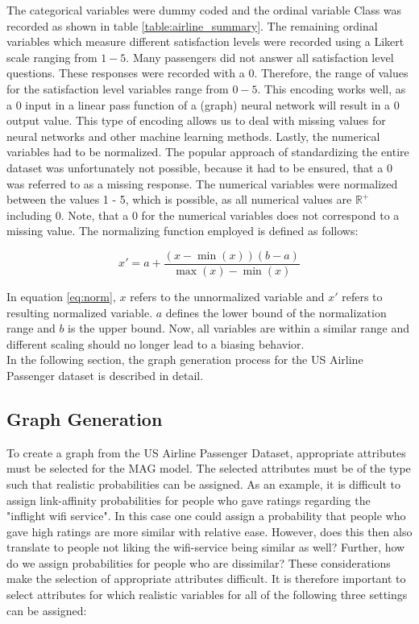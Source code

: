   \noindent The categorical variables were dummy coded and the ordinal variable
  Class was recorded as shown in table \ref{table:airline_summary}. The
  remaining ordinal variables which measure different satisfaction levels were
  recorded using a Likert scale ranging from $1 - 5$. Many passengers did not
  answer all satisfaction level questions. These responses were recorded
  with a 0. Therefore, the range of values for the satisfaction level variables
  range from $0 - 5$. This encoding works well, as a 0 input in a linear pass
  function of a (graph) neural network will result in a 0 output value. This
  type of encoding allows us to deal with missing values for neural networks
  and other machine learning methods. Lastly, the numerical variables had to be
  normalized. The popular approach of standardizing the entire dataset was 
  unfortunately not possible, because it had to be ensured, that a 0 was 
  referred to as a missing response. The numerical variables were normalized 
  between the values 1 - 5, which is possible, as all numerical values are 
  $\mathbb{R}^{+}$ including 0. Note, that a 0 for the numerical variables does
  not correspond to a missing value. The normalizing function employed is
  defined as follows:

  \begin{equation}
    x' = a + \frac{(x - \min(x))(b - a)}{\max(x) - \min(x)}
    \label{eq:norm}
  \end{equation}

  \noindent In equation \ref{eq:norm}, $x$ refers to the unnormalized 
  variable and $x'$ refers to resulting normalized variable. $a$ defines 
  the lower bound of the normalization range and $b$ is the upper bound. Now,
  all variables are within a similar range and different scaling should no
  longer lead to a biasing behavior. \\

  \noindent In the following section, the graph generation process for the US
  Airline Passenger dataset is described in detail.

  \subsection{Graph Generation}

  To create a graph from the US Airline Passenger Dataset, appropriate
  attributes must be selected for the MAG model. The selected attributes must be
  of the type such that realistic probabilities can be assigned. As an example, 
  it is difficult to assign link-affinity probabilities for people who gave 
  ratings regarding the "inflight wifi service". In this case one could assign 
  a probability that people who gave high ratings are more similar with 
  relative ease. However, does this then also translate to people not liking 
  the wifi-service being similar as well? Further, how do we assign 
  probabilities for people who are dissimilar? These considerations make the 
  selection of appropriate attributes difficult. It is therefore important to 
  select attributes for which realistic variables for all of the following
  three settings can be assigned:

